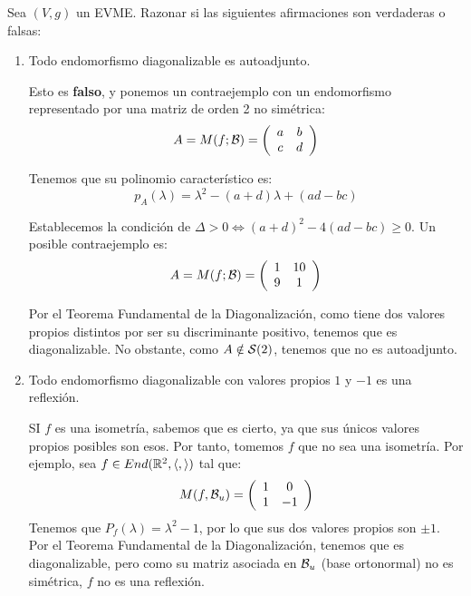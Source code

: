 \begin{ejercicio}
    Sea $(V, g)$ un EVME. Razonar si las siguientes afirmaciones son verdaderas o falsas:
    \begin{enumerate}
        \item Todo endomorfismo diagonalizable es autoadjunto.

        Esto es \textbf{falso}, y ponemos un contraejemplo con un endomorfismo representado por una matriz de orden 2 no simétrica:
        \begin{equation*}
            A=M(f;\mathcal{B}) = \left(\begin{array}{cc}
                a & b \\
                c & d
            \end{array}\right)
        \end{equation*}

        Tenemos que su polinomio característico es:
        \begin{equation*}
            p_A(\lambda)=\lambda^2-(a+d)\lambda +(ad-bc)
        \end{equation*}

        Establecemos la condición de $\Delta > 0 \Longleftrightarrow (a+d)^2-4(ad-bc)\geq 0$. Un posible contraejemplo es:
        \begin{equation*}
            A=M(f;\mathcal{B}) = \left(\begin{array}{cc}
                1 & 10 \\
                9 & 1
            \end{array}\right)
        \end{equation*}

        Por el Teorema Fundamental de la Diagonalización, como tiene dos valores propios distintos por ser su discriminante positivo, tenemos que es diagonalizable. No obstante, como $A\notin \mathcal{S}(2)$, tenemos que no es autoadjunto.

        \item Todo endomorfismo diagonalizable con valores propios $1$ y $-1$ es una reflexión.

        SI $f$ es una isometría, sabemos que es cierto, ya que sus únicos valores propios posibles son esos. Por tanto, tomemos $f$ que no sea una isometría. Por ejemplo, sea $f\in End(\mathbb{R}^2,\langle ,\rangle)$ tal que:
        \begin{equation*}
            M(f, \mathcal{B}_u) = \left(\begin{array}{cc}
                1 & 0 \\
                1 & -1
            \end{array}\right)
        \end{equation*}
        Tenemos que $P_f(\lambda)=\lambda^2-1$, por lo que sus dos valores propios son $\pm 1$. Por el Teorema Fundamental de la Diagonalización, tenemos que es diagonalizable, pero como su matriz asociada en $\mathcal{B}_u$ (base ortonormal) no es simétrica, $f$ no es una reflexión.


\end{enumerate}
\end{ejercicio}
